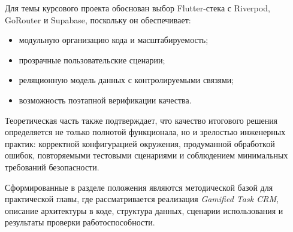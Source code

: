 Для темы курсового проекта обоснован выбор Flutter-стека с Riverpod, GoRouter и Supabase, поскольку он обеспечивает:
\begin{itemize}
  \item модульную организацию кода и масштабируемость;
  \item прозрачные пользовательские сценарии;
  \item реляционную модель данных с контролируемыми связями;
  \item возможность поэтапной верификации качества.
\end{itemize}

Теоретическая часть также подтверждает, что качество итогового решения определяется не только полнотой функционала, но и зрелостью инженерных практик: корректной конфигурацией окружения, продуманной обработкой ошибок, повторяемыми тестовыми сценариями и соблюдением минимальных требований безопасности.

Сформированные в разделе положения являются методической базой для практической главы, где рассматривается реализация \textit{Gamified Task CRM}, описание архитектуры в коде, структура данных, сценарии использования и результаты проверки работоспособности.
